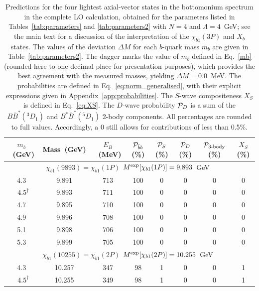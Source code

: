 \documentclass[aps,prd,showpacs,amsmath,twocolumn,superscriptaddress,floatfix,nofootinbib,notitlepage]{revtex4-2}
\newcommand{\Xb}{X_b}
\newcommand{\unit}[1]{~(#1)}
\begin{document}
\begin{table}[t!]
\centering
\caption{Predictions for the four lightest axial-vector states in the bottomonium spectrum in the complete LO calculation, obtained for the parameters listed in Tables~\ref{tab:parameters} and \ref{tab:parameters2} with $N=4$ and $\Lambda=4$~GeV; see the main text for a discussion of the interpretation of the $\chi_{b1}(3P)$ and $\Xb$ states. 
The values of the deviation $\Delta M$ for each $b$-quark mass $m_b$ are given in Table~\ref{tab:parameters2}. The dagger marks the value of $m_b$ defined in Eq.~\eqref{mb} (rounded here to one decimal place for presentation purposes), which provides the best agreement with the measured masses, yielding $\Delta M=0.0$~MeV. The probabilities are defined in Eq.~\eqref{eq:norm_generalised}, with their explicit expressions given in Appendix~\ref{app:probabilities}. The $S$-wave compositeness $X_S$ is defined in Eq.~\eqref{eq:XS}.
The $D$-wave probability ${\cal P}_D$ is a sum of the $B\bar{B}^*(^3D_1)$ and $B^*\bar{B}^*(^5D_1)$ 2-body components.
All percentages are rounded to full values. Accordingly, a 0 still allows for contributions of less than 0.5\%. 
}
\label{tab:results}
\begin{ruledtabular}
\setlength{\tabcolsep}{1.4pt}
\begin{tabular}{c|c|c|c|c|c|c|c}
$m_b$\unit{GeV} & Mass\unit{GeV} & $E_B$\unit{MeV}
& ${\cal P}_{\bar{b}b}$ (\%) & ${\cal P}_S$ (\%)
& ${\cal P}_D$ (\%) & ${\cal P}_{\text{3-body}}$ (\%)
& $X_S$ (\%) \\
\hline
\multicolumn{8}{c}{$\chi_{b1}(9893)=\chi_{b1}(1P)$\quad
$M^{\rm exp}[\chi_{b1}(1P)]=9.893$~GeV~\cite{ParticleDataGroup:2026mpi}}
\\
\hline
4.3 & 9.891 & 713 & 100 & 0 & 0 & 0 & 0 \\
~$4.5^\dagger$ & 9.893 & 711 & 100 & 0 & 0 & 0 & 0 \\
4.7 & 9.895 & 710 & 100 & 0 & 0 & 0 & 0 \\
4.9 & 9.896 & 708 & 100 & 0 & 0 & 0 & 0 \\
5.1 & 9.898 & 706 & 100 & 0 & 0 & 0 & 0 \\
5.3 & 9.899 & 705 & 100 & 0 & 0 & 0 & 0 \\
\hline
\multicolumn{8}{c}{$\chi_{b1}(10255)=\chi_{b1}(2P)$\quad
$M^{\rm exp}[\chi_{b1}(2P)]=10.255$~GeV~\cite{ParticleDataGroup:2026mpi}}
\\
\hline
4.3 & 10.257 & 347 & 98 & 1 & 0 & 0 & 1 \\
~$4.5^\dagger$ & 10.255 & 349 & 98 & 1 & 0 & 0 & 1 \\

\end{tabular}
\end{ruledtabular}
\end{table}
\end{document}
